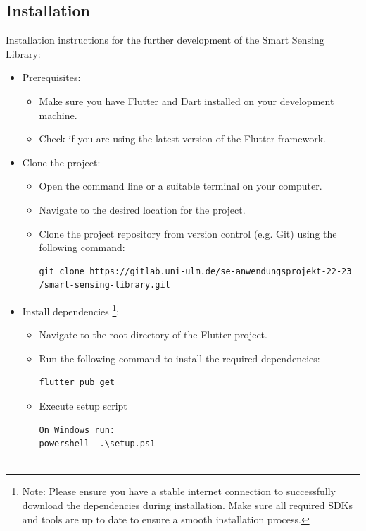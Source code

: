 \documentclass[12pt]{article}
\newcounter{fr}
\begin{document}
\subsection{Installation}
\label{ssec:demoapp}
Installation instructions for the further development of the Smart Sensing Library:
\begin{itemize}
    \item Prerequisites:
        \begin{itemize}
        \item Make sure you have Flutter and Dart installed on your development machine.
        \item Check if you are using the latest version of the Flutter framework.
        \end{itemize}
    \item Clone the project:
        \begin{itemize}
        \item Open the command line or a suitable terminal on your computer.
        \item Navigate to the desired location for the project.
        \item Clone the project repository from version control (e.g. Git) using the following command:
\begin{verbatim}
git clone https://gitlab.uni-ulm.de/se-anwendungsprojekt-22-23
/smart-sensing-library.git
\end{verbatim}
        \end{itemize}
    \item Install dependencies
\footnote{
Note: Please ensure you have a stable internet connection to successfully download the dependencies during installation. 
Make sure all required SDKs and tools are up to date to ensure a smooth installation process.}:
        \begin{itemize}
        \item Navigate to the root directory of the Flutter project.
        \item Run the following command to install the required dependencies:
\begin{verbatim}
flutter pub get
\end{verbatim}
        \item Execute setup script
\begin{verbatim}
On Windows run:
powershell  .\setup.ps1


\end{verbatim}
\end{itemize}
\end{itemize}
\end{document}
